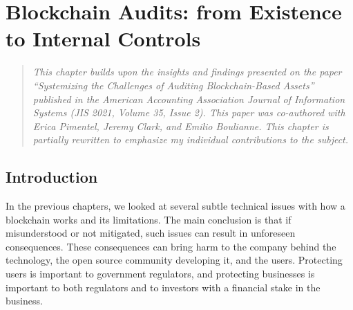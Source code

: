 
\chapter{Blockchain Audits: from Existence to Internal Controls} \label{sec:auditing} 







\begin{quote}
	\textit{This chapter builds upon the insights and findings presented on the paper ``Systemizing the Challenges of Auditing Blockchain-Based Assets''~\cite{pimentel2021systemizing} published in the American Accounting Association Journal of Information Systems (JIS 2021, Volume 35, Issue 2). This paper was co-authored with Erica Pimentel, Jeremy Clark, and Emilio Boulianne. This chapter is partially rewritten to emphasize my individual contributions to the subject.}
\end{quote}



\section{Introduction} \label{sec:auditing:intro}

In the previous chapters, we looked at several subtle technical issues with how a blockchain works and its limitations. The main conclusion is that if misunderstood or not mitigated, such issues can result in unforeseen consequences. These consequences can bring harm to the company behind the technology, the open source community developing it, and the users. Protecting users is important to government regulators, and protecting businesses is important to both regulators and to investors with a financial stake in the business. 


